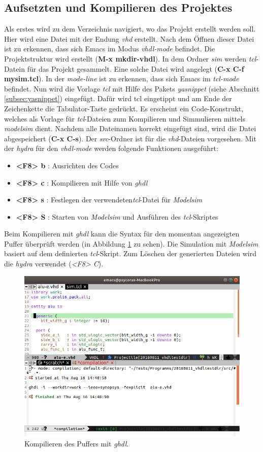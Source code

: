 \subsection{Aufsetzten und Kompilieren des Projektes}
Als erstes wird zu dem Verzeichnis navigiert, wo das Projekt erstellt
werden soll. Hier wird eine Datei mit der Endung \textit{vhd}
erstellt. Nach dem Öffnen dieser Datei ist zu erkennen, dass sich
Emacs im Modus \textit{vhdl-mode} befindet. Die Projektstruktur wird
erstellt (\textbf{M-x mkdir-vhdl}). In dem Ordner \textit{sim} werden
\textit{tcl}-Datein für das Projekt gesammelt. Eine solche Datei wird
angelegt (\textbf{C-x C-f mysim.tcl}). In der \textit{mode-line} ist
zu erkennen, dass sich Emacs im \textit{tcl-mode} befindet. Nun wird
die Vorlage \textit{tcl} mit Hilfe des Pakets \textit{yasnippet}
(siehe Abschnitt \ref{subsec:yasnippet}) eingefügt. Dafür wird
{\glqq}tcl{\grqq} eingetippt und am Ende der Zeichenkette die
Tabulator-Taste gedrückt. Es erscheint ein Code-Konstrukt, welches als
Vorlage für \textit{tcl}-Dateien zum Kompilieren und Simmulieren
mittels \textit{modelsim} dient. Nachdem alle Dateinamen korrekt
eingefügt sind, wird die Datei abgespeichert (\textbf{C-x C-s}). Der
\textit{src}-Ordner ist für die \textit{vhd}-Dateien vorgesehen. Mit
der \textit{hydra} für den \textit{vhdl-mode} werden folgende
Funktionen ausgeführt:
\begin{itemize}
\item \textbf{<F8> b} : Ausrichten des Codes
\item \textbf{<F8> c} : Kompilieren mit Hilfe von \textit{ghdl}
\item \textbf{<F8> s} : Festlegen der verwendeten\textit{tcl}-Datei
  für \textit{Modelsim}
\item \textbf{<F8> S} : Starten von \textit{Modelsim} und Ausführen
  des \textit{tcl}-Skriptes\\
\end{itemize}
Beim Kompilieren mit \textit{ghdl} kann die Syntax für den momentan
angezeigten Puffer überprüft werden (in Abbildung \ref{fig:ghdl} zu
sehen). Die Simulation mit \textit{Modelsim} basiert auf dem
definierten \textit{tcl}-Skript. Zum Löschen der generierten Dateien
wird die \textit{hydra} verwendet (\textit{<F8> C}).\\

\begin{figure}[h]
  \centering
  \includegraphics[width=.95\textwidth]{./images/Workflow/ghdl.png}
  \caption{\label{fig:ghdl} Kompilieren des Puffers mit \textit{ghdl}.}
\end{figure}
